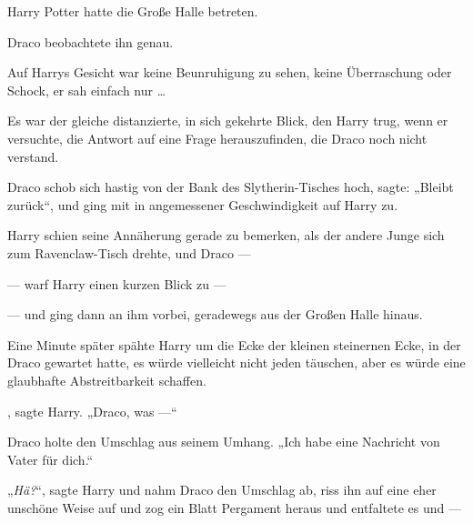 Harry Potter hatte die Große Halle betreten.

Draco beobachtete ihn genau.

Auf Harrys Gesicht war keine Beunruhigung zu sehen, keine Überraschung oder Schock, er sah einfach nur …

Es war der gleiche distanzierte, in sich gekehrte Blick, den Harry trug, wenn er versuchte, die Antwort auf eine Frage herauszufinden, die Draco noch nicht verstand.

Draco schob sich hastig von der Bank des Slytherin-Tisches hoch, sagte:
„Bleibt zurück“, und ging mit in angemessener Geschwindigkeit auf Harry zu.

Harry schien seine Annäherung gerade zu bemerken, als der andere Junge sich zum Ravenclaw-Tisch drehte, und Draco —

— warf Harry einen kurzen Blick zu —

— und ging dann an ihm vorbei, geradewegs aus der Großen Halle hinaus.

Eine Minute später spähte Harry um die Ecke der kleinen steinernen Ecke, in der Draco gewartet hatte, es würde vielleicht nicht jeden täuschen, aber es würde eine glaubhafte Abstreitbarkeit schaffen.

, sagte Harry.
„Draco, was —“

Draco holte den Umschlag aus seinem Umhang.
„Ich habe eine Nachricht von Vater für dich.“

„\emph{Hä?}“, sagte Harry und nahm Draco den Umschlag ab, riss ihn auf eine eher unschöne Weise auf und zog ein Blatt Pergament heraus und entfaltete es und —

